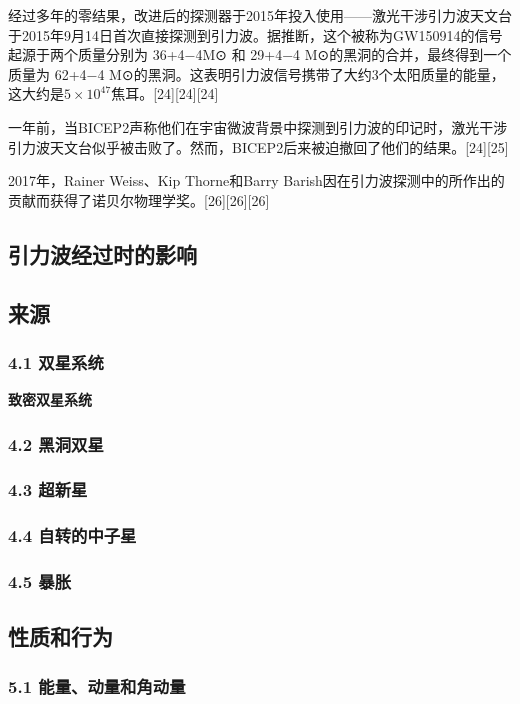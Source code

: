 经过多年的零结果，改进后的探测器于2015年投入使用——激光干涉引力波天文台于2015年9月14日首次直接探测到引力波。据推断，这个被称为GW150914的信号起源于两个质量分别为 36+4−4M⊙ 和 29+4−4 M⊙的黑洞的合并，最终得到一个质量为 62+4−4 M⊙的黑洞。这表明引力波信号携带了大约3个太阳质量的能量，这大约是$ 5\times10^{47}$焦耳。[24][24][24]

一年前，当BICEP2声称他们在宇宙微波背景中探测到引力波的印记时，激光干涉引力波天文台似乎被击败了。然而，BICEP2后来被迫撤回了他们的结果。[24][25]

2017年，Rainer Weiss、Kip Thorne和Barry Barish因在引力波探测中的所作出的贡献而获得了诺贝尔物理学奖。[26][26][26]

\subsection{引力波经过时的影响}

\subsection{来源}

\subsubsection{4.1 双星系统}

\textbf{致密双星系统}

\subsubsection{4.2 黑洞双星}

\subsubsection{4.3 超新星}

\subsubsection{4.4 自转的中子星}

\subsubsection{4.5 暴胀}

\subsection{性质和行为}

\subsubsection{5.1 能量、动量和角动量}

